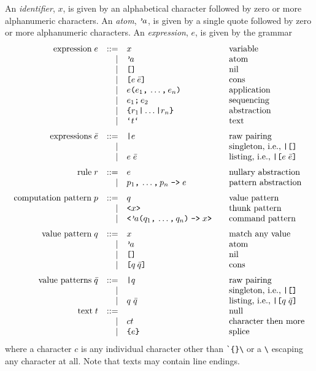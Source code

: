 \documentclass{article}
\begin{document}
\newcommand{\qt}{\mbox{\tt '}\!} 
\newcommand{\pa}[1]{\mbox{\tt (}#1\mbox{\tt )}} 
\newcommand{\bk}[1]{\mbox{\tt [}#1\mbox{\tt ]}} 
\newcommand{\bc}[1]{\mbox{\tt \{}#1\mbox{\tt \}}}
\newcommand{\ch}[1]{\mbox{\tt <}#1\mbox{\tt >}}
\newcommand{\sq}{\mbox{\tt ;}\,}
\newcommand{\ba}{\mbox{\tt |}}
\newcommand{\cm}{\mbox{\tt ,}\,}
\newcommand{\ar}{\mbox{\tt ->}}
\newcommand{\tk}[1]{\mbox{\tt `}#1\mbox{\tt `}}
An \emph{identifier}, $x$, is given by an alphabetical character followed by zero or more alphanumeric characters.
An \emph{atom}, $\qt a$, is given by a single quote followed by zero or more alphanumeric characters.
An \emph{expression}, $e$, is given by the grammar
\[\begin{array}{rrl@{\qquad}l}
\mbox{expression}\;
e & ::= & x & \mbox{variable} \\
  &   | & \qt a & \mbox{atom} \\
  &   | & \bk{} & \mbox{nil} \\
  &   | & \bk{e\:\bar{e}} & \mbox{cons} \\
  &   | & e\pa{e_1\cm\ldots\cm e_n} & \mbox{application} \\
  &   | & e_1\sq e_2 & \mbox{sequencing} \\
  &   | & \bc{r_1 \ba\ldots\ba r_n} & \mbox{abstraction} \\
  &   | & \tk t & \mbox{text} \medskip \\
\mbox{expressions}\;
\bar{e} & ::= & \ba e & \mbox{raw pairing} \\
  &   | & & \mbox{singleton, i.e.,}\; \ba \bk{} \\
  &   | & e\;\bar{e} & \mbox{listing, i.e.,}\; \ba \bk{e\;\bar{e}} \medskip \\
\mbox{rule}\;
r & ::= & e & \mbox{nullary abstraction} \\
  &   | & p_1\cm\ldots\cm p_n \;\ar\;e & \mbox{pattern abstraction} \medskip \\
\mbox{computation pattern}\;
p & ::= & q & \mbox{value pattern} \\
  &   | & \ch{x} & \mbox{thunk pattern} \\
  &   | & \ch{\qt a\pa{q_1\cm\ldots\cm q_n}\;\ar\; x} & \mbox{command pattern} \medskip\\
\mbox{value pattern}\;
q & ::= & x & \mbox{match any value} \\
  &   | & \qt a & \mbox{atom} \\
  &   | & \bk{} & \mbox{nil} \\
  &   | & \bk{q\:\bar{q}} & \mbox{cons} \medskip\\
\mbox{value patterns}\;
\bar{q} & ::= & \ba q & \mbox{raw pairing} \\
  &   | & & \mbox{singleton, i.e.,}\; \ba \bk{} \\
  &   | & q\;\bar{q} & \mbox{listing, i.e.,}\; \ba \bk{q\;\bar{q}} \\
\mbox{text}\;
t & ::= & & \mbox{null} \\
  &   | & ct & \mbox{character then more} \\
  &   | & \bc{e} & \mbox{splice} 
\end{array}\]
where a character $c$ is any individual character other than \verb|`{}\| or a \verb|\| escaping any character at all. Note that texts may contain line endings.
\end{document}
